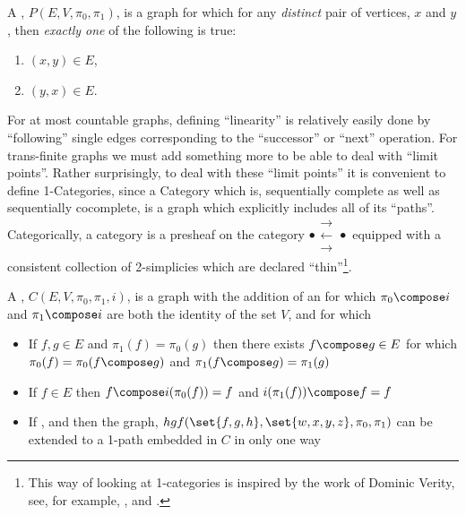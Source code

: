 \documentclass[a4paper,openany]{amsart}
\begin{document}
\begin{definition}

A , $P(E, V, \pi_0, \pi_1)$, is a graph for which for any
\emph{distinct} pair of vertices, $x$ and $y$, then \emph{exactly one} of the following is
true:

\begin{enumerate}
\item $(x,y) \in E$, 
\item $(y,x) \in E$.
\end{enumerate}

\end{definition}




For at most countable graphs, defining ``linearity'' is relatively easily done by
``following'' single edges corresponding to the ``successor'' or ``next'' operation. For
trans-finite graphs we must add something more to be able to deal with ``limit points''.
Rather surprisingly, to deal with these ``limit points'' it is convenient to define
1-Categories, since a Category which is, sequentially complete as well as sequentially
cocomplete, is a graph which explicitly includes all of its ``paths''. Categorically, a
category is a presheaf on the category
$ \bullet \substack{\mathbf{\longrightarrow} \\[-0.7ex] \mathbf{\longleftarrow} 
\\[-0.7ex] \mathbf{\longrightarrow} } \bullet $
equipped with a consistent collection of 2-simplicies which are declared
``thin''\footnote{This way of looking at 1-categories is inspired by the work of Dominic
Verity, see, for example, \cite{verity2005complicialSets},
\cite{verity2006complicialSimplicialHomotopy} and
\cite{verity2006simplicialComplicialCategories}.}.

\begin{definition}

A , $C(E, V, \pi_0, \pi_1, i)$, is a graph with the addition of an 
  for which $\pi_0 \compose i$ and $\pi_1 
\compose i$ are both the identity of the set $V$, and for which 

\begin{itemize}

\item If $f, g \in E$ and $\pi_1(f) = \pi_0(g)$ then there exists $f \compose g \in E$ for 
which $ \pi_0(f) = \pi_0(f \compose g)$ and $ \pi_1(f \compose g) = \pi_1(g)$

\item If $f \in E$ then $ f \compose i(\pi_0(f)) = f$ and $i(\pi_1(f)) \compose f = f$

\item If ,  and  then the graph, $hgf(\set{f,
g, h}, \set{w, x, y, z}, \pi_0, \pi_1)$ can be extended to a 1-path embedded in $C$ in only 
one way

\end{itemize}

\end{definition}
\end{document}
